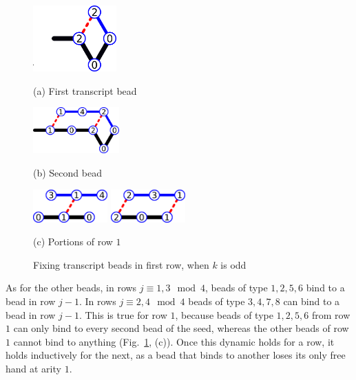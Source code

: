 \begin{figure}[tb]
	\begin{minipage}{.35\textwidth}
		\centering
		\includegraphics[align=c,height=1in]{./Fig/CI_1n}\\
		\bigskip
		
		(a) First transcript bead 
	\end{minipage}%
	\begin{minipage}{.2\textwidth}
		\centering
		\includegraphics[align=c,height=0.7in]{./Fig/CI_2n}\\
		\bigskip
		
		(b) Second bead
	\end{minipage}
	\begin{minipage}{.4\textwidth}
		\centering
		\includegraphics[align=c,height=0.5in]{./Fig/CI_3n}
		\bigskip
		\vspace{0.1in}
		\includegraphics[align=c,height=0.5in]{./Fig/CI_4n}
		\bigskip
		
		(c) Portions of row $1$
	\end{minipage}
	\caption{Fixing transcript beads in first row, when $k$ is odd}
	\label{CI:1-4}
\end{figure}


As for the other beads, in rows $j\equiv 1,3\mod 4$, beads of type $1,2,5,6$ bind to a bead in row $j-1$. In rows $j\equiv 2,4\mod 4$ beads of type $3,4,7,8$ can bind to a bead in row $j-1$.  This is true for row $1$, because beads of type $1,2,5,6$ from row $1$ can only bind to every second bead of the seed, whereas the other beads of row $1$ cannot bind to anything (Fig.~\ref{CI:1-4}, (c)). Once this dynamic holds for a row, it holds inductively for the next, as a bead that binds to another loses its only free hand at arity $1$.

